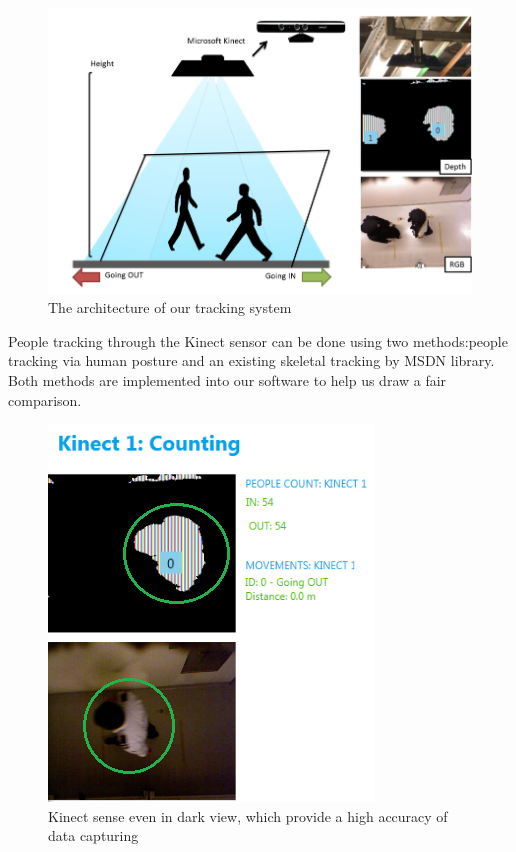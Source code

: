 \documentclass{sig-alternate}
\begin{document}
\begin{figure} [!ht]
  \begin{center}
	  	\includegraphics[width=1.05\columnwidth]{minisys.png}
  \end{center}
  \caption{The architecture of our tracking system}\label{fig:minisys}
\end{figure}

People tracking through the Kinect sensor can be done using two methods:people tracking via human posture and an existing skeletal tracking by MSDN library. Both methods are implemented into our software to help us draw a fair comparison.

\begin{figure}[!ht]
  \centering
 	  	\includegraphics[width=0.7\columnwidth]{darkview.png}
  \caption{Kinect sense even in dark view, which provide a high accuracy of data capturing}
\end{figure}
\end{document}
